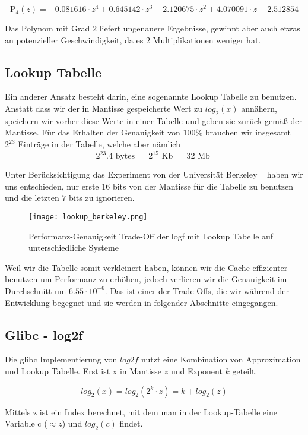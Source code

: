 \begin{equation}
    \mathrm{P_{4}}(z) = -0.081616 \cdot z^{4} + 0.645142 \cdot z^{3} -2.120675 \cdot z^{2} + 4.070091 \cdot z -2.512854
    \label{eq:deg4}
\end{equation}

Das Polynom mit Grad $2$ liefert ungenauere Ergebnisse, gewinnt aber auch etwas an potenzieller Geschwindigkeit, da es $2$ Multiplikationen weniger hat.

\subsection{Lookup Tabelle }
Ein anderer Ansatz besteht darin, eine sogenannte Lookup Tabelle zu benutzen. Anstatt dass wir der in Mantisse gespeicherte Wert zu $log_2(x)$ annähern, speichern wir vorher diese Werte in einer Tabelle und geben sie zurück gemäß der Mantisse. Für das Erhalten der Genauigkeit von $100\%$ brauchen wir insgesamt $2^{23}$ Einträge in der Tabelle, welche aber nämlich 
\[2^{23} . 4 \text{ bytes } = 2^{15} \text{ Kb } = 32 \text{ Mb }\]

Unter Berücksichtigung das Experiment von der Universität Berkeley ~\cite{fast_log} haben wir uns entschieden, nur erste $16$ bits von der Mantisse für die Tabelle zu benutzen und die letzten $7$ bits zu ignorieren.

\begin{figure}[h]
    \centering
    \texttt{[image: lookup\_berkeley.png]}
    \caption{Performanz-Genauigkeit Trade-Off der logf mit Lookup Tabelle auf unterschiedliche Systeme}
    \label{graph:lookup_berkeley}
\end{figure}

Weil wir die Tabelle somit verkleinert haben, können wir die Cache effizienter benutzen um Performanz zu erhöhen, jedoch verlieren wir die Genauigkeit im Durchschnitt um $6.55 \cdot 10^{-6}$. Das ist einer der Trade-Offs, die wir während der Entwicklung begegnet und sie werden in folgender Abschnitte eingegangen.
 
\subsection{Glibc - log2f}
Die glibc Implementierung von $log2f$ nutzt eine Kombination von Approximation und Lookup Tabelle. Erst ist x in Mantisse $z$ und Exponent $k$ geteilt.

\[log_2(x) = log_2(2^k \cdot z) = k + log_2(z) \]

Mittels z ist ein Index berechnet, mit dem man in der Lookup-Tabelle eine Variable c ($\approx z$) und $log_2(c)$ findet.

